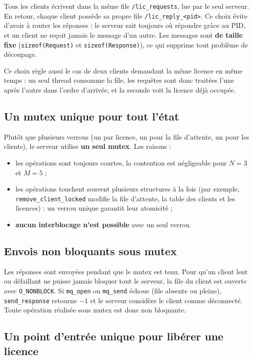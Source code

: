 \documentclass[11pt,a4paper]{article}
\newcommand{\code}[1]{\texttt{#1}}
\begin{document}
Tous les clients écrivent dans la même file \code{/lic\_requests}, lue par le seul serveur. En retour, chaque client possède sa propre file \code{/lic\_reply\_<pid>}. Ce choix évite d'avoir à router les réponses : le serveur sait toujours où répondre grâce au PID, et un client ne reçoit jamais le message d'un autre. Les messages sont \textbf{de taille fixe} (\code{sizeof(Request)} et \code{sizeof(Response)}), ce qui supprime tout problème de découpage.

Ce choix règle aussi le cas de deux clients demandant la même licence en même temps : un seul thread consomme la file, les requêtes sont donc traitées l'une après l'autre dans l'ordre d'arrivée, et la seconde voit la licence déjà occupée.

\subsection{Un mutex unique pour tout l'état}

Plutôt que plusieurs verrous (un par licence, un pour la file d'attente, un pour les clients), le serveur utilise \textbf{un seul mutex}. Les raisons :
\begin{itemize}
  \item les opérations sont toujours courtes, la contention est négligeable pour $N=3$ et $M=5$ ;
  \item les opérations touchent souvent plusieurs structures à la fois (par exemple, \code{remove\_client\_locked} modifie la file d'attente, la table des clients et les licences) : un verrou unique garantit leur atomicité ;
  \item \textbf{aucun interblocage n'est possible} avec un seul verrou.
\end{itemize}

\subsection{Envois non bloquants sous mutex}

Les réponses sont envoyées pendant que le mutex est tenu. Pour qu'un client lent ou défaillant ne puisse jamais bloquer tout le serveur, la file du client est ouverte avec \code{O\_NONBLOCK}. Si \code{mq\_open} ou \code{mq\_send} échoue (file absente ou pleine), \code{send\_response} retourne $-1$ et le serveur considère le client comme déconnecté. Toute opération réalisée sous mutex est donc non bloquante.

\subsection{Un point d'entrée unique pour libérer une licence}
\end{document}
